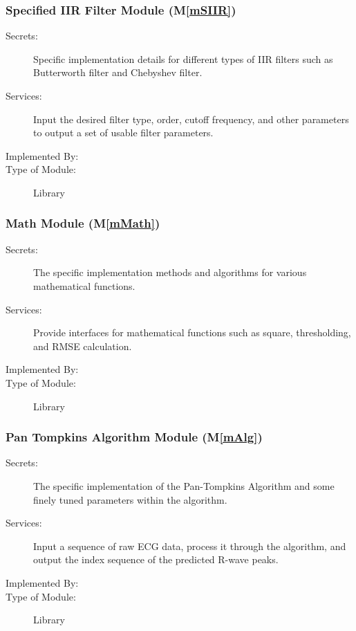\documentclass[12pt, titlepage]{article}
\newcommand{\mref}[1]{M\ref{#1}}
\begin{document}
\subsubsection{Specified IIR Filter Module (\mref{mSIIR})}

\begin{description}
\item[Secrets:]Specific implementation details for different types of IIR
filters such as Butterworth filter and Chebyshev filter.
\item[Services:]Input the desired filter type, order, cutoff frequency, and
other parameters to output a set of usable filter parameters.
\item[Implemented By:] \progname
\item[Type of Module:] Library
\end{description}

\subsubsection{Math Module (\mref{mMath})}

\begin{description}
\item[Secrets:]The specific implementation methods and algorithms for various
mathematical functions.
\item[Services:]Provide interfaces for mathematical functions such as square,
thresholding, and RMSE calculation.
\item[Implemented By:] \progname
\item[Type of Module:] Library
\end{description}

\subsubsection{Pan Tompkins Algorithm Module (\mref{mAlg})}

\begin{description}
\item[Secrets:]The specific implementation of the Pan-Tompkins Algorithm and
some finely tuned parameters within the algorithm.
\item[Services:]Input a sequence of raw ECG data, process it through the
algorithm, and output the index sequence of the predicted R-wave peaks.
\item[Implemented By:] \progname
\item[Type of Module:] Library
\end{description}
\end{document}
